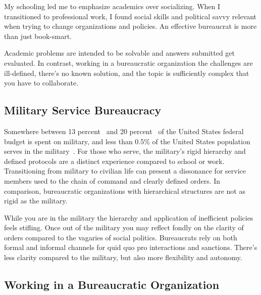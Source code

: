 My schooling led me to emphasize academics over socializing. When I transitioned to professional work, I found social skills and political savvy relevant when trying to change organizations and policies. An effective bureaucrat is more than just book-smart. 

Academic problems are intended to be solvable and answers submitted get evaluated. In contrast, working in a bureaucratic organization the challenges are ill-defined, there's no known solution, and the topic is sufficiently complex that you have to collaborate.







\subsection*{Military Service Bureaucracy\label{bureaucracy-of-military}}
Somewhere between 13 percent~\cite{2023_cbpp} and 
20 percent~\cite{2019_Koshgarian} of 
the United States federal budget is spent on military, and 
less than 0.5\% of the United States population serves in the
military~\cite{2020_demo_mil_CFR}.
For those who serve, the military's rigid hierarchy and defined protocols are a distinct experience compared to school or work. Transitioning from military to civilian life can present a dissonance for service members used to the chain of command and clearly defined orders. In comparison, bureaucratic organizations with hierarchical structures are not as rigid as the military. 

While you are in the military the hierarchy and application of inefficient policies feels stifling. Once out of the military you may reflect fondly on the clarity of orders compared to the vagaries of social politics.  Bureaucrats rely on both formal and informal channels for quid quo pro interactions and sanctions. There's less clarity compared to the military, but also more flexibility and autonomy. 

\subsection*{Working in a Bureaucratic Organization\label{sec:bureaucracy-of-work}}

